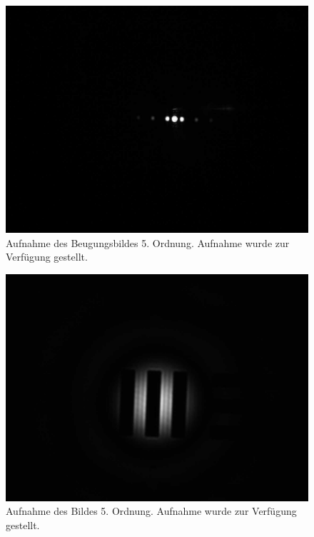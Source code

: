 \documentclass{article}
\begin{document}
\begin{minipage}[t]{.45\textwidth}
\begin{figure}[H]
\includegraphics[scale=0.1]{jw/L_BB_2.jpg}
\caption{Aufnahme des Beugungsbildes 5. Ordnung. Aufnahme wurde zur Verfügung gestellt.}
\label{fig:bbild_5_jw}
\end{figure}
\end{minipage}
\hfill
\noindent
\begin{minipage}[t]{.45\textwidth}
\begin{figure}[H]
\includegraphics[scale=0.1]{jw/L_OB_2.jpg}
\caption{Aufnahme des Bildes 5. Ordnung. Aufnahme wurde zur Verfügung gestellt.}\label{fig:bild_5_jw}
\end{figure}
\end{minipage}
\end{document}
